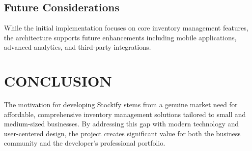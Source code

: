 \subsection{Future Considerations}
While the initial implementation focuses on core inventory management features, the architecture supports future enhancements including mobile applications, advanced analytics, and third-party integrations.

\section{CONCLUSION}

The motivation for developing Stockify stems from a genuine market need for affordable, comprehensive inventory management solutions tailored to small and medium-sized businesses. By addressing this gap with modern technology and user-centered design, the project creates significant value for both the business community and the developer's professional portfolio.